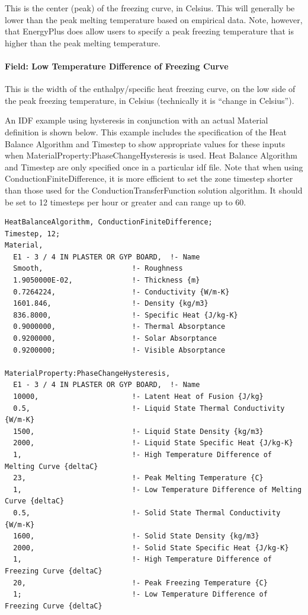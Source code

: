 This is the center (peak) of the freezing curve, in Celsius.  This will generally be lower than the peak melting temperature based on empirical data.  Note, however, that EnergyPlus does allow users to specify a peak freezing temperature that is higher than the peak melting temperature.

\paragraph{Field: Low Temperature Difference of Freezing Curve}\label{materialpropertyphasechangehysteresis-inputs-low-temperature-difference-of-freezing-curve}

This is the width of the enthalpy/specific heat freezing curve, on the low side of the peak freezing temperature, in Celsius (technically it is ``change in Celsius'').

An IDF example using hysteresis in conjunction with an actual Material definition is shown below.  This example includes the specification of the Heat Balance Algorithm and Timestep to show appropriate values for these inputs when MaterialProperty:PhaseChangeHysteresis is used.  Heat Balance Algorithm and Timestep are only specified once in a particular idf file.  Note that when using ConductionFiniteDifference, it is more efficient to set the zone timestep shorter than those used for the ConductionTransferFunction solution algorithm.  It should be set to 12 timesteps per hour or greater and can range up to 60.

\begin{lstlisting}
HeatBalanceAlgorithm, ConductionFiniteDifference;
Timestep, 12;
Material,
  E1 - 3 / 4 IN PLASTER OR GYP BOARD,  !- Name
  Smooth,                     !- Roughness
  1.9050000E-02,              !- Thickness {m}
  0.7264224,                  !- Conductivity {W/m-K}
  1601.846,                   !- Density {kg/m3}
  836.8000,                   !- Specific Heat {J/kg-K}
  0.9000000,                  !- Thermal Absorptance
  0.9200000,                  !- Solar Absorptance
  0.9200000;                  !- Visible Absorptance

MaterialProperty:PhaseChangeHysteresis,
  E1 - 3 / 4 IN PLASTER OR GYP BOARD,  !- Name
  10000,                      !- Latent Heat of Fusion {J/kg}
  0.5,                        !- Liquid State Thermal Conductivity {W/m-K}
  1500,                       !- Liquid State Density {kg/m3}
  2000,                       !- Liquid State Specific Heat {J/kg-K}
  1,                          !- High Temperature Difference of Melting Curve {deltaC}
  23,                         !- Peak Melting Temperature {C}
  1,                          !- Low Temperature Difference of Melting Curve {deltaC}
  0.5,                        !- Solid State Thermal Conductivity {W/m-K}
  1600,                       !- Solid State Density {kg/m3}
  2000,                       !- Solid State Specific Heat {J/kg-K}
  1,                          !- High Temperature Difference of Freezing Curve {deltaC}
  20,                         !- Peak Freezing Temperature {C}
  1;                          !- Low Temperature Difference of Freezing Curve {deltaC}
\end{lstlisting}

